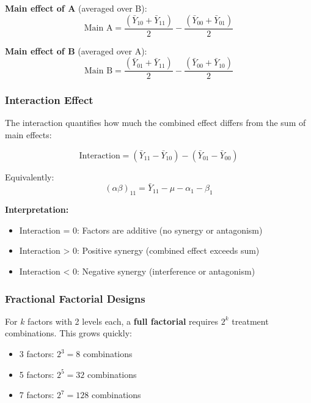 \textbf{Main effect of A} (averaged over B):
\begin{equation}
\text{Main A} = \frac{(\bar{Y}_{10} + \bar{Y}_{11})}{2} - \frac{(\bar{Y}_{00} + \bar{Y}_{01})}{2}
\end{equation}

\textbf{Main effect of B} (averaged over A):
\begin{equation}
\text{Main B} = \frac{(\bar{Y}_{01} + \bar{Y}_{11})}{2} - \frac{(\bar{Y}_{00} + \bar{Y}_{10})}{2}
\end{equation}

\subsubsection{Interaction Effect}

The interaction quantifies how much the combined effect differs from the sum of main effects:

\begin{equation}
\text{Interaction} = (\bar{Y}_{11} - \bar{Y}_{10}) - (\bar{Y}_{01} - \bar{Y}_{00})
\end{equation}

Equivalently:
\begin{equation}
(\alpha\beta)_{11} = \bar{Y}_{11} - \mu - \alpha_1 - \beta_1
\end{equation}

\textbf{Interpretation:}
\begin{itemize}
    \item Interaction = 0: Factors are additive (no synergy or antagonism)
    \item Interaction > 0: Positive synergy (combined effect exceeds sum)
    \item Interaction < 0: Negative synergy (interference or antagonism)
\end{itemize}

\subsubsection{Fractional Factorial Designs}

For $k$ factors with 2 levels each, a \textbf{full factorial} requires $2^k$ treatment combinations. This grows quickly:
\begin{itemize}
    \item 3 factors: $2^3 = 8$ combinations
    \item 5 factors: $2^5 = 32$ combinations
    \item 7 factors: $2^7 = 128$ combinations
\end{itemize}

